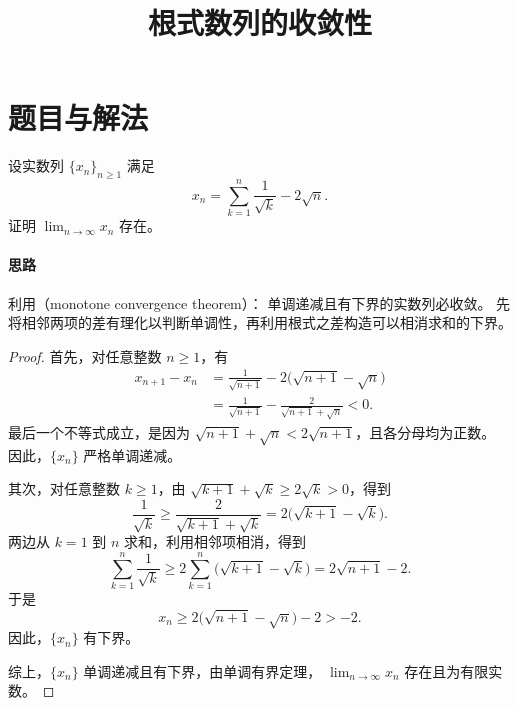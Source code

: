 \documentclass{ctexart}
\title{根式数列的收敛性}
\author{}
\date{}
\begin{document}
\maketitle

\section{题目与解法}

\begin{example}
  设实数列 $\{x_n\}_{n\ge1}$ 满足
  \[
    x_n=\sum_{k=1}^{n}\frac{1}{\sqrt{k}}-2\sqrt{n}.
  \]
  证明 $\displaystyle\lim_{n\to\infty}x_n$ 存在。
\end{example}

\paragraph{思路}
利用（monotone convergence theorem）：
单调递减且有下界的实数列必收敛。
先将相邻两项的差有理化以判断单调性，再利用根式之差构造可以相消求和的下界。

\begin{proof}
\color{black}
首先，对任意整数 $n\ge1$，有
\begin{align*}
  x_{n+1}-x_n
  &=\frac{1}{\sqrt{n+1}}-2\bigl(\sqrt{n+1}-\sqrt{n}\bigr)\\
  &=\frac{1}{\sqrt{n+1}}-
    \frac{2}{\sqrt{n+1}+\sqrt{n}}<0.
\end{align*}
最后一个不等式成立，是因为
$\sqrt{n+1}+\sqrt{n}<2\sqrt{n+1}$，且各分母均为正数。
因此，$\{x_n\}$ 严格单调递减。

其次，对任意整数 $k\ge1$，由
$\sqrt{k+1}+\sqrt{k}\ge2\sqrt{k}>0$，得到
\[
  \frac{1}{\sqrt{k}}
  \ge\frac{2}{\sqrt{k+1}+\sqrt{k}}
  =2\bigl(\sqrt{k+1}-\sqrt{k}\bigr).
\]
两边从 $k=1$ 到 $n$ 求和，利用相邻项相消，得到
\[
  \sum_{k=1}^{n}\frac{1}{\sqrt{k}}
  \ge2\sum_{k=1}^{n}\bigl(\sqrt{k+1}-\sqrt{k}\bigr)
  =2\sqrt{n+1}-2.
\]
于是
\[
  x_n\ge2\bigl(\sqrt{n+1}-\sqrt{n}\bigr)-2>-2.
\]
因此，$\{x_n\}$ 有下界。

综上，$\{x_n\}$ 单调递减且有下界，由单调有界定理，
$\displaystyle\lim_{n\to\infty}x_n$ 存在且为有限实数。
\end{proof}
\end{document}
